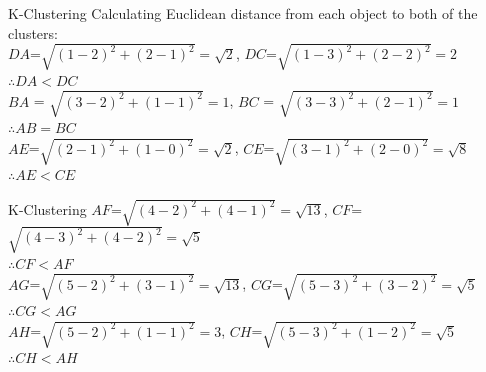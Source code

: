 \begin{frame}{K-Clustering}
  Calculating Euclidean distance from each object to both of the clusters:\\
  $DA$=$\sqrt{{(1-2)}^2+{(2-1)}^2}=\sqrt{2}$,
  $DC$=$\sqrt{{(1-3)}^2+{(2-2)}^2}=2$\\
  $\therefore DA<DC$\\
  $BA$ = $\sqrt{{(3-2)}^2+{(1-1)}^2}=1$,
  $BC$ = $\sqrt{{(3-3)}^2+{(2-1)}^2}=1$\\
  $\therefore AB=BC$\\
  $AE$=$\sqrt{{(2-1)}^2+{(1-0)}^2}=\sqrt{2}$,
  $CE$=$\sqrt{{(3-1)}^2+{(2-0)}^2}=\sqrt{8}$\\
  $\therefore AE<CE$\\
\end{frame}

\begin{frame}{K-Clustering}
  $AF$=$\sqrt{{(4-2)}^2+{(4-1)}^2}=\sqrt{13}$,
  $CF$=$\sqrt{{(4-3)}^2+{(4-2)}^2}=\sqrt{5}$\\
  $\therefore CF<AF$\\
  $AG$=$\sqrt{{(5-2)}^2+{(3-1)}^2}=\sqrt{13}$,
  $CG$=$\sqrt{{(5-3)}^2+{(3-2)}^2}=\sqrt{5}$\\
  $\therefore CG<AG$\\
  $AH$=$\sqrt{{(5-2)}^2+{(1-1)}^2}=3$,
  $CH$=$\sqrt{{(5-3)}^2+{(1-2)}^2}=\sqrt{5}$\\
  $\therefore CH<AH$\\
\end{frame}
